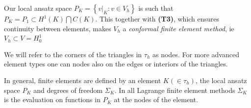 \documentclass[../Main/main.tex]{subfiles}
\begin{document}
	\begin{remark}
	Our local ansatz space $P_K = \left \{ v|_K:v\in V_h \right \}$ is such that $P_K = P_1 \subset H^1(K) \bigcap C(K)$. This together with \textbf{(T3)}, which ensures continuity between elements, makes $V_h$ a \emph{conformal finite element method}, ie $V_h \subset V = H_0^1$
	\end{remark}
	\begin{remark}[Nodes]
		We will refer to the corners of the triangles in $\tau_h$ as nodes. For more advanced element types one can nodes also on the edges or interiors of the triangles.
	\end{remark}
	\begin{remark}
		In general, finite elements are defined by an element $K(\in \tau_h)$, the local ansatz space $P_K$ and degrees of freedom $\Sigma_K$. In all Lagrange finite element methods $\Sigma_K$ is the evaluation on functions in $P_K$ at the nodes of the element.
	\end{remark}
\end{document}

